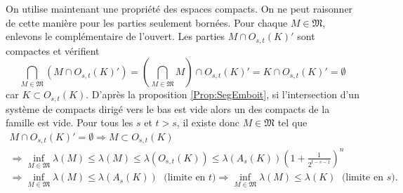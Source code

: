 \begin{demo}
On utilise maintenant une propriété des espaces compacts. On ne peut raisonner de cette manière pour les parties seulement bornées.\newline
Pour chaque $M\in \mathfrak{M}$, enlevons le complémentaire de l'ouvert. Les parties $M \cap O_{s,t}(K)'$ sont compactes et vérifient
\begin{displaymath}
 \bigcap_{M \in \mathfrak{M}} \left(M \cap O_{s,t}(K)'\right)
 = \left(\bigcap_{M \in \mathfrak{M}} M\right) \cap O_{s,t}(K)'
 = K \cap O_{s,t}(K)'
 = \emptyset
\end{displaymath}
car $K \subset O_{s,t}(K)$.\newline
D'après la proposition \ref{Prop:SegEmboit}, si l'intersection d'un système de compacts dirigé vers le bas est vide alors un des compacts de la famille est vide.\newline
Pour tous les $s$ et $t>s$, il existe donc $M \in \mathfrak{M}$ tel que
\begin{multline*}
 M \cap O_{s,t}(K)'=\emptyset
 \Rightarrow M \subset O_{s,t}(K) \\
  \Rightarrow
  \inf_{M \in \mathfrak{M}}\lambda(M) \leq \lambda(M) \leq  \lambda(O_{s,t}(K)) \leq \lambda(A_s(K)) \left( 1 + \frac{1}{2^{t-s-1}}\right)^n \\
  \Rightarrow
  \inf_{M \in \mathfrak{M}}\lambda(M) \leq \lambda(A_s(K)) \; \text{ (limite en $t$)}
  \Rightarrow
  \inf_{M \in \mathfrak{M}}\lambda(M) \leq \lambda(K) \; \text{ (limite en $s$)}.
\end{multline*}
\end{demo}

